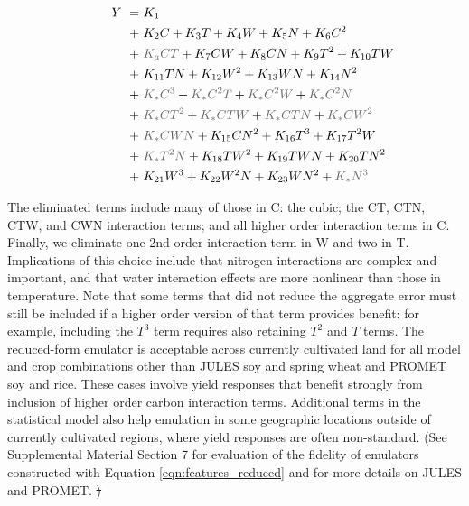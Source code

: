 \documentclass[gmdd]{copernicus} %
\providecommand{\DIFadd}[1]{{\protect\color{blue}\uwave{#1}}} %
\providecommand{\DIFdel}[1]{{\protect\color{red}\sout{#1}}}                      %
\providecommand{\DIFaddbegin}{} %
\providecommand{\DIFaddend}{} %
\providecommand{\DIFdelbegin}{} %
\providecommand{\DIFdelend}{} %
\begin{document}
\DIFdelend \vspace{-0.3in}
\begin{align}
    \hspace{10mm}  \label{eqn:features_reduced}
        Y\ = \ & K_{1} \\
        + \ & K_{2} C                        + K_{3} T                        + K_{4} W                        + K_{5} N       + K_{6} C^2      \nonumber \\
        + \ & {\color{dark-gray}K_{a} C T}   + K_{7} C W                      + K_{8} C N                      + K_{9} T^2     + K_{10} T W     \nonumber \\
        + \ & K_{11} T N                     + K_{12} W^2                     + K_{13} W N                     + K_{14} N^2                     \nonumber \\
        + \ & {\color{dark-gray}K_{*} C^3}   + {\color{dark-gray}K_{*} C^2 T} + {\color{dark-gray}K_{*} C^2 W} + {\color{dark-gray}K_{*} C^2 N} \nonumber \\
        + \ & {\color{dark-gray}K_{*} C T^2} + {\color{dark-gray}K_{*} C T W} + {\color{dark-gray}K_{*} C T N} + {\color{dark-gray}K_{*} C W^2} \nonumber \\
        + \ & {\color{dark-gray}K_{*} C W N} + K_{15} C N^2                   + K_{16} T^3                     + K_{17} T^2 W                   \nonumber \\
        + \ & {\color{dark-gray}K_{*} T^2 N} + K_{18} T W^2                   + K_{19} T W N                   + K_{20} T N^2                   \nonumber \\
        + \ & K_{21} W^3                     + K_{22} W^2 N                   + K_{23} W N^2                   + {\color{dark-gray}K_{*} N^3}   \nonumber
\end{align}

\noindent The eliminated terms include many of those in C: the cubic; the CT, CTN, CTW, and CWN interaction terms; and all higher order interaction terms in C. 
Finally, we eliminate one 2nd-order interaction term in W and two in T. 
Implications of this choice include that nitrogen interactions are complex and important, and that water interaction effects are more nonlinear than those in temperature.  
Note that some terms that did not reduce the aggregate error must still be included if a higher order version of that term provides benefit: for example, including the $T^3$ term requires also retaining $T^2$ and $T$ terms. 
The reduced-form emulator is acceptable across currently cultivated land for all model and crop combinations other than JULES soy and spring wheat and PROMET soy and rice.
These cases involve yield responses that benefit strongly from inclusion of higher order carbon \DIFaddbegin \DIFadd{dioxide }\DIFaddend interaction terms. 
Additional terms in the statistical model also help emulation in some geographic locations outside of currently cultivated regions, where yield responses are often non-standard. 
\DIFdelbegin \DIFdel{(}\DIFdelend See Supplemental Material Section 7 for evaluation of the fidelity of emulators constructed with Equation \ref{eqn:features_reduced} and for more details on JULES and PROMET.
\DIFdelbegin \DIFdel{)
}\DIFdelend 
\end{document}

